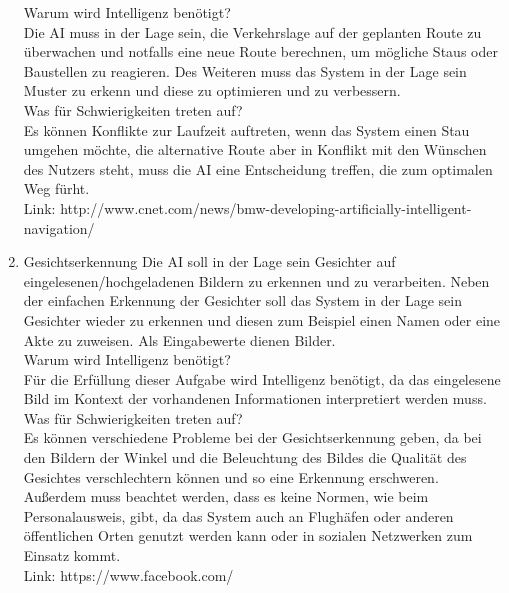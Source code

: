 \documentclass[a4paper]{scrartcl}
\begin{document}
\begin{enumerate}
      Warum wird Intelligenz benötigt? \\
      Die AI muss in der Lage sein, die Verkehrslage auf der geplanten Route zu
      überwachen und notfalls eine neue Route berechnen, um mögliche Staus oder
      Baustellen zu reagieren. Des Weiteren  muss das System in der Lage sein Muster zu erkenn
      und diese zu optimieren und zu verbessern.\\

      Was für Schwierigkeiten treten auf? \\
      Es können Konflikte zur Laufzeit auftreten, wenn das System einen Stau umgehen
      möchte, die alternative Route aber in Konflikt mit den Wünschen des Nutzers steht,
      muss die AI eine Entscheidung treffen, die zum optimalen Weg fürht. \\

      Link: http://www.cnet.com/news/bmw-developing-artificially-intelligent-navigation/ \\

    \item{Gesichtserkennung}
      Die AI soll in der Lage sein Gesichter auf eingelesenen/hochgeladenen Bildern zu erkennen und zu
      verarbeiten. Neben der einfachen Erkennung der Gesichter soll das System in der Lage sein Gesichter
      wieder zu erkennen und diesen zum Beispiel einen Namen oder eine Akte zu zuweisen. Als Eingabewerte
      dienen Bilder. \\

      Warum wird Intelligenz benötigt? \\
      Für die Erfüllung dieser Aufgabe wird Intelligenz benötigt, da das eingelesene
      Bild im Kontext der vorhandenen Informationen interpretiert werden muss. \\

      Was für Schwierigkeiten treten auf? \\
      Es können verschiedene Probleme bei der Gesichtserkennung geben, da bei den Bildern
      der Winkel und die Beleuchtung des Bildes die Qualität des Gesichtes verschlechtern
      können und so eine Erkennung erschweren. Außerdem muss beachtet werden, dass es keine
      Normen, wie beim Personalausweis, gibt, da das System auch an Flughäfen oder anderen
      öffentlichen Orten genutzt werden kann oder in sozialen Netzwerken zum Einsatz kommt. \\

      Link: https://www.facebook.com/ \\

\end{enumerate}
\end{document}

